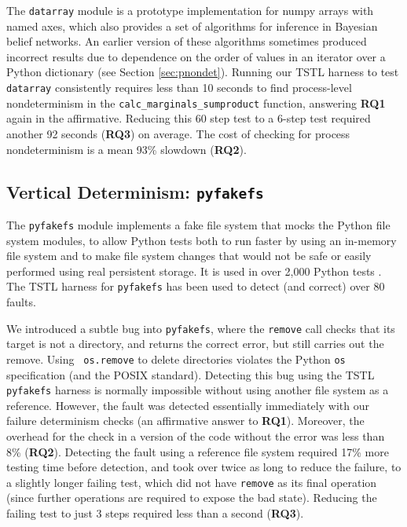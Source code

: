 {The {\tt datarray} module \cite{datarray} is a prototype
implementation for numpy arrays with named axes, which also provides a set of algorithms for
inference in
Bayesian belief networks.  An earlier
version of these algorithms sometimes produced incorrect results due to dependence on the order of values in
an iterator over a Python dictionary (see Section \ref{sec:pnondet}).  
Running our TSTL
harness to test {\tt datarray} consistently requires less than 10 seconds to find process-level nondeterminism in
the {\tt calc\_marginals\_sumproduct} function, answering {\bf RQ1}
again in the affirmative.  Reducing this 60 step test to a 6-step test 
required another 92 seconds ({\bf RQ3}) on average.  The cost of
checking for process nondeterminism 
is a mean 93\% slowdown ({\bf RQ2}).  

\subsection {Vertical Determinism: {\tt pyfakefs}}

The {\tt pyfakefs} \cite{pyfakefs} module implements a fake file
system that mocks the Python file system modules, to allow Python
tests both to run faster by using an in-memory file system and to make
file system changes that would not be safe or easily performed using
real persistent storage. It is used in over 2,000 Python tests
\cite{pyfakefs}.
The TSTL harness for {\tt pyfakefs} has been used to detect (and
correct) over 80 faults.


We introduced a subtle bug into {\tt pyfakefs}, where the {\tt remove}
call checks that its target is not a directory, and returns the
correct error, but still carries out the remove.  Using {\tt
  os.remove} to delete directories violates the Python {\tt os}
specification (and the POSIX standard).  Detecting this bug using the TSTL
{\tt pyfakefs} harness is normally impossible without using another
file system as a reference.  However, the fault was detected  essentially
immediately with our failure determinism checks (an affirmative answer
to {\bf RQ1}).  Moreover, the overhead for the check in a
version of the code without the error was
less than 8\%  ({\bf RQ2}).  Detecting the fault using a reference file system 
required 17\% more testing time before detection, and took over twice as
long to reduce the failure, to a
slightly longer failing test, which did not have {\tt remove} as its
final operation (since further operations are required to 
expose the bad state).
Reducing
the failing test to just 3 steps required less than a second ({\bf RQ3}).

}
